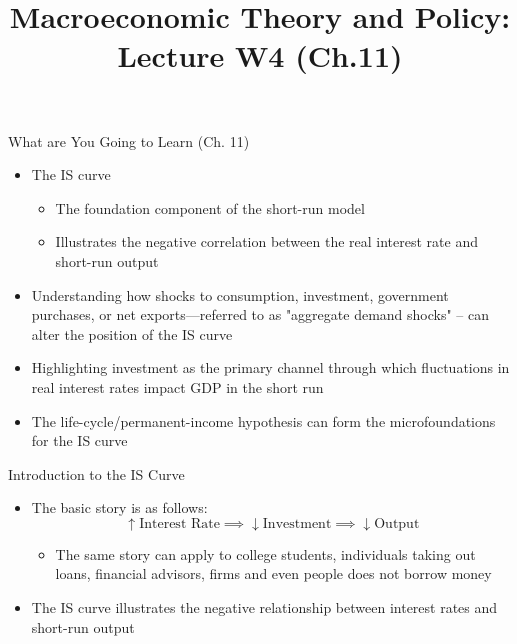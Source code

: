 \documentclass[aspectratio=1610]{beamer}
\title[Winter - Lecture 4] %
{Macroeconomic Theory and Policy: Lecture  W4 (Ch.11)}
\author[University of Toronto] %
{}
\date[] %
\begin{document}
\begin{frame}
  \titlepage
\end{frame}

\begin{frame}[wide]{What are You Going to Learn (Ch. 11)}
	\begin{itemize}
		\item The IS curve
		\begin{itemize}
			\item The foundation component of the short-run model
			\item Illustrates the negative correlation between the real interest rate and short-run output
		\end{itemize}
		\item Understanding how shocks to consumption, investment, government purchases, or net exports—referred to as "aggregate demand shocks" -- can alter the position of the IS curve
		\item Highlighting investment as the primary channel through which fluctuations in real interest rates impact GDP in the short run
		\item The life-cycle/permanent-income hypothesis can form the microfoundations for the IS curve
	
		
	\end{itemize}
\end{frame}

\begin{frame}[wide]{Introduction to the IS Curve}
	\begin{itemize}
		\item The basic story is as follows: 
		\[\uparrow \text{Interest Rate} \implies \downarrow \text{Investment} \implies \downarrow \text{Output}\]
		\begin{itemize}
			\item The same story can apply to college students, individuals taking out loans, financial advisors, firms and even people does not borrow money
		\end{itemize}
		\vspace{8mm}
		\item The IS curve illustrates the negative relationship between interest rates and short-run output		
	\end{itemize}
\end{frame}
\end{document}
